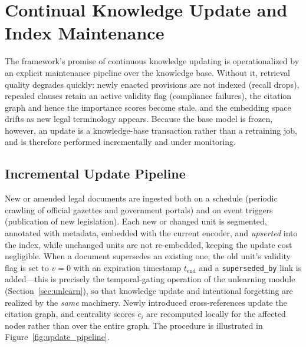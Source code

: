 \section{Continual Knowledge Update and Index Maintenance}
\label{sec:update}

The framework's promise of continuous knowledge updating is operationalized by an explicit maintenance pipeline over the knowledge base. Without it, retrieval quality degrades quickly: newly enacted provisions are not indexed (recall drops), repealed clauses retain an active validity flag (compliance failures), the citation graph and hence the importance scores become stale, and the embedding space drifts as new legal terminology appears. Because the base model is frozen, however, an update is a knowledge-base transaction rather than a retraining job, and is therefore performed incrementally and under monitoring.

\subsection{Incremental Update Pipeline}
New or amended legal documents are ingested both on a schedule (periodic crawling of official gazettes and government portals) and on event triggers (publication of new legislation). Each new or changed unit is segmented, annotated with metadata, embedded with the current encoder, and \emph{upserted} into the index, while unchanged units are not re-embedded, keeping the update cost negligible. When a document supersedes an existing one, the old unit's validity flag is set to $v=0$ with an expiration timestamp $t_{\text{end}}$ and a \texttt{superseded\_by} link is added---this is precisely the temporal-gating operation of the unlearning module (Section~\ref{sec:unlearn}), so that knowledge update and intentional forgetting are realized by the \emph{same} machinery. Newly introduced cross-references update the citation graph, and centrality scores $c_i$ are recomputed locally for the affected nodes rather than over the entire graph. The procedure is illustrated in Figure~\ref{fig:update_pipeline}.

